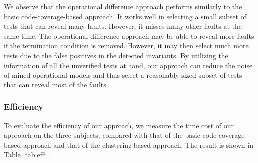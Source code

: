 \documentclass{sig-alternate}
\begin{document}
We observe that the operational difference approach performs
similarly to the basic code-coverage-based approach. It works well
in selecting a small subset of tests that can reveal many faults.
However, it misses many other faults at the same time. The
operational difference approach may be able to reveal more faults if
the termination condition is removed. However, it may then select
much more tests due to the false positives in the detected
invariants. By utilizing the information of all the unverified tests
at hand, our approach can reduce the noise of mined operational
models and thus select a reasonably sized subset of tests that can
reveal most of the faults.



\vspace{-0.1in}

\subsubsection{Efficiency}



To evaluate the efficiency of our approach, we measure the time cost
of our approach on the three subjects, compared with that of the
basic code-coverage-based approach and that of the clustering-based
approach. The result is shown in Table \ref{tab:effi}.
\end{document}
